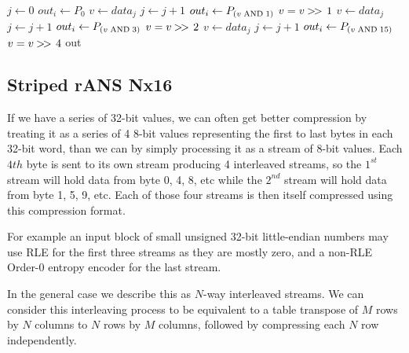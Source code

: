\documentclass[a4paper]{article}
\begin{document}
\begin{algorithmic}[1]
  \State $j \gets 0$ 
   
      \State $out_i \gets P_0$
    \EndFor
  \Statex
   
        \State $v \gets data_j$
        \State $j \gets j+1$
      \EndIf
      \State $out_i \gets P_{(v \bitand 1)}$
      \State $v = v \mathbin{>\mkern-3mu>\,} 1$
    \EndFor
  \Statex
   
        \State $v \gets data_j$
        \State $j \gets j+1$
      \EndIf
      \State $out_i \gets P_{(v \bitand 3)}$
      \State $v = v \mathbin{>\mkern-3mu>\,} 2$
    \EndFor
  \Statex
   
        \State $v \gets data_j$
        \State $j \gets j+1$
      \EndIf
      \State $out_i \gets P_{(v \bitand 15)}$
      \State $v = v \mathbin{>\mkern-3mu>\,} 4$
    \EndFor
  \Statex
  \Else
    \State {}
  \EndIf
  \Statex
  \State \Return out
\EndFunction
\end{algorithmic}


\subsection{Striped rANS Nx16}
\label{sec:ransstripe}

If we have a series of 32-bit values, we can often get better compression by
treating it as a series of 4 8-bit values representing the first to
last bytes in each 32-bit word, than we can by simply processing it as
a stream of 8-bit values.
Each $4{th}$ byte is sent to its own stream producing 4 interleaved streams, so the $1^{st}$ stream will hold data from byte 0, 4, 8, etc while the $2^{nd}$ stream will hold data from byte 1, 5, 9, etc.
Each of those four streams is then itself compressed using this compression format.

For example an input block of small unsigned 32-bit little-endian numbers may use RLE for the first three streams as they are mostly zero, and a non-RLE Order-0 entropy encoder for the last stream.

In the general case we describe this as $N$-way interleaved streams.
We can consider this interleaving process to be equivalent to a table
transpose of $M$ rows by $N$ columns to $N$ rows by $M$ columns,
followed by compressing each $N$ row independently.
\end{document}
